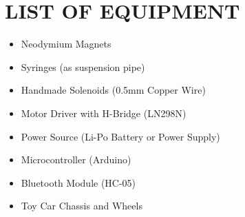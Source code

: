 \documentclass[a4paper, 10pt, conference]{IEEEtran}
\begin{document}
\section{LIST OF EQUIPMENT}
\begin{itemize}
    \item Neodymium Magnets
    \item Syringes (as suspension pipe)
    \item Handmade Solenoids (0.5mm Copper Wire)
    \item Motor Driver with H-Bridge (LN298N)
    \item Power Source (Li-Po Battery or Power Supply)
    \item Microcontroller (Arduino)
    \item Bluetooth Module (HC-05)
    \item Toy Car Chassis and Wheels
\end{itemize}

\printbibliography{}
\end{document}
